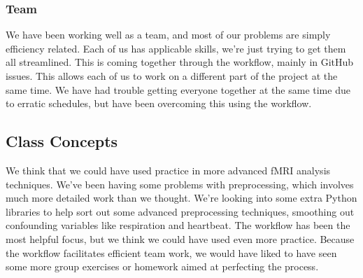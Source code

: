 \documentclass[11pt]{article}
\begin{document}
\subsubsection{Team}

We have been working well as a team, and most of our problems are simply
efficiency related. Each of us has applicable skills, we're just trying to get
them all streamlined. This is coming together through the workflow, mainly in
GitHub issues. This allows each of us to work on a different part of the
project at the same time. We have had trouble getting everyone together at the
same time due to erratic schedules, but have been overcoming this using the
workflow.

\subsection{Class Concepts}

We think that we could have used practice in more advanced fMRI analysis
techniques. We've been having some problems with preprocessing, which involves
much more detailed work than we thought. We're looking into some extra Python
libraries to help sort out some advanced preprocessing techniques, smoothing
out confounding variables like respiration and heartbeat. The workflow has been
the most helpful focus, but we think we could have used even more practice.
Because the workflow facilitates efficient team work, we would have liked to
have seen some more group exercises or homework aimed at perfecting the
process.


\end{document}
